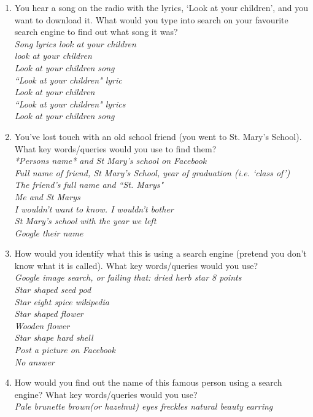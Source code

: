 \documentclass[a4paper, 11pt]{article}
\begin{document}
\begin{enumerate}\label{asdresponses}
\item{You hear a song on the radio with the lyrics, `Look at your children', and you want to download it. What would you type into search on your favourite search engine to find out what song it was?\\\textit{Song lyrics look at your children\\
look at your children\\
Look at your children song\\
``Look at your children" lyric\\
Look at your children\\
``Look at your children" lyrics\\
Look at your children song\\}}
\item{You've lost touch with an old school friend (you went to St. Mary's School). What key words/queries would you use to find them?\\\textit{*Persons name* and St Mary's school on Facebook\\Full name of friend, St Mary's School, year of graduation (i.e. `class of')\\
The friend's full name and ``St. Marys"\\
Me and St Marys\\
I wouldn't want to know. I wouldn't bother\\
St Mary's school with the year we left \\
Google their name}}
\item{How would you identify what this is using a search engine (pretend you don't know what it is called). What key words/queries would you use?\\\textit{Google image search, or failing that: dried herb star 8 points\\
Star shaped seed pod\\
Star eight spice wikipedia\\
Star shaped flower \\
Wooden flower\\
Star shape hard shell \\
Post a picture on Facebook\\
No answer}}
\item{How would you find out the name of this famous person using a search engine? What key words/queries would you use?\\\textit{Pale brunette brown(or hazelnut) eyes freckles natural beauty earring\\
}}
\end{enumerate}
\end{document}

